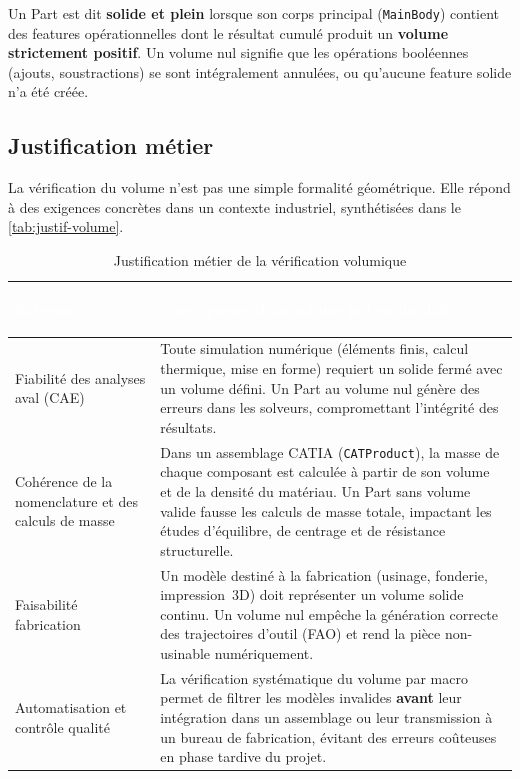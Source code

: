 Un Part est dit \textbf{solide et plein} lorsque son corps principal (\texttt{MainBody}) contient des features opérationnelles dont le résultat cumulé produit un \textbf{volume strictement positif}. Un volume nul signifie que les opérations booléennes (ajouts, soustractions) se sont intégralement annulées, ou qu'aucune feature solide n'a été créée.

\subsection{Justification métier}

La vérification du volume n'est pas une simple formalité géométrique. Elle répond à des exigences concrètes dans un contexte industriel, synthétisées dans le \autoref{tab:justif-volume}.

\begin{table}[H]
    \centering
    \caption{Justification métier de la vérification volumique}
    \label{tab:justif-volume}
    \begin{tabularx}{\textwidth}{|>{\bfseries\raggedright\arraybackslash}p{3.8cm}|X|}
        \hline
        \rowcolor{headerblue}
        \textcolor{white}{\textbf{Exigence}} & \centering\textcolor{white}{\textbf{Conséquence d'un volume nul ou invalide}} \tabularnewline
        \hline
        \rowcolor{rowlight}
        Fiabilité des analyses aval (CAE) & Toute simulation numérique (éléments finis, calcul thermique, mise en forme) requiert un solide fermé avec un volume défini. Un Part au volume nul génère des erreurs dans les solveurs, compromettant l'intégrité des résultats. \\
        \hline
        \rowcolor{rowwhite}
        Cohérence de la nomenclature et des calculs de masse & Dans un assemblage CATIA (\texttt{CATProduct}), la masse de chaque composant est calculée à partir de son volume et de la densité du matériau. Un Part sans volume valide fausse les calculs de masse totale, impactant les études d'équilibre, de centrage et de résistance structurelle. \\
        \hline
        \rowcolor{rowlight}
        Faisabilité fabrication & Un modèle destiné à la fabrication (usinage, fonderie, impression~3D) doit représenter un volume solide continu. Un volume nul empêche la génération correcte des trajectoires d'outil (FAO) et rend la pièce non-usinable numériquement. \\
        \hline
        \rowcolor{rowwhite}
        Automatisation et contrôle qualité & La vérification systématique du volume par macro permet de filtrer les modèles invalides \textbf{avant} leur intégration dans un assemblage ou leur transmission à un bureau de fabrication, évitant des erreurs coûteuses en phase tardive du projet. \\
        \hline
    \end{tabularx}
\end{table}


